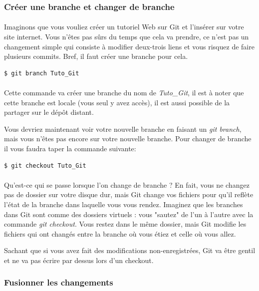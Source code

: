 \documentclass[french, a4paper, 12pt, titlepage]{article}
\begin{document}
\subsubsection{Créer une branche et changer de branche}
\paragraph{}Imaginons que vous vouliez créer un tutoriel Web sur Git et l'insérer sur votre site internet. Vous n’êtes pas sûrs du temps que cela va prendre, ce n’est pas un changement simple qui consiste à modifier deux-trois liens et vous risquez de faire plusieurs commits. Bref, il faut créer une branche pour cela.
\begin{lstlisting}
$ git branch Tuto_Git
\end{lstlisting}

\paragraph{}Cette commande va créer une branche du nom de \emph{Tuto\_Git}, il est à noter que cette branche est locale (vous seul y avez accès), il est aussi possible de la partager sur le dépôt distant.

Vous devriez maintenant voir votre nouvelle branche en faisant un \emph{git branch}, mais vous n'êtes pas encore sur votre nouvelle branche. Pour changer de branche il vous faudra taper la commande suivante:
\begin{lstlisting}
$ git checkout Tuto_Git
\end{lstlisting}

\paragraph{}Qu’est-ce qui se passe lorsque l’on change de branche ? En fait, vous ne changez pas de dossier sur votre disque dur, mais Git change vos fichiers pour qu’il reflète l’état de la branche dans laquelle vous vous rendez. Imaginez que les branches dans Git sont comme des dossiers virtuels : vous "sautez" de l’un à l’autre avec la commande \emph{git checkout}. Vous restez dans le même dossier, mais Git modifie les fichiers qui ont changés entre la branche où vous étiez et celle où vous allez.

Sachant que si vous avez fait des modifications non-enregistrées, Git va être gentil et ne va pas écrire par dessus lors d'un checkout.

\subsubsection{Fusionner les changements}
\end{document}
